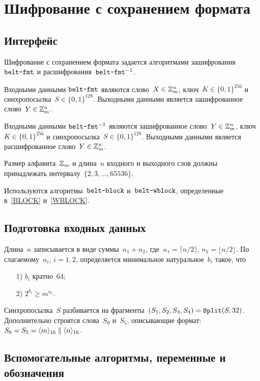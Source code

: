 \section{Шифрование с сохранением формата}\label{FMT}

\subsection{Интерфейс}\label{FMT.IFace}

Шифрование с сохранением формата задается алгоритмами зашифрования
$\texttt{belt-fmt}$ и расшифрования~$\texttt{belt-fmt}^{-1}$.

Входными данными $\texttt{belt-fmt}$ являются 
слово~$X\in\mathbb{Z}_m^n$, ключ~$K\in\{0,1\}^{256}$ 
и синхропосылка~$S\in\{0,1\}^{128}$.
%
Выходными данными является зашифрованное слово~$Y\in\mathbb{Z}_m^n$.

Входными данными $\texttt{belt-fmt}^{-1}$ являются 
зашифрованное слово~$Y\in\mathbb{Z}_m^n$, ключ~$K\in\{0,1\}^{256}$ 
и синхропосылка~$S\in\{0,1\}^{128}$.
%
Выходными данными является расшифрованное слово~$Y\in\mathbb{Z}_m^n$.

Размер алфавита~$\mathbb{Z}_m$ и длина~$n$ входного и выходного слов 
должны принадлежать интервалу~$\{2,3,\ldots,65536\}$.

Используются алгоритмы~$\texttt{belt-block}$ и~$\texttt{belt-wblock}$,
определенные в~\ref{BLOCK} и~\ref{WBLOCK}.

\subsection{Подготовка входных данных}\label{FMT.Data}

Длина~$n$ записывается в виде суммы~$n_1+n_2$,
где~$n_1=\lceil n/2\rceil$, $n_2=\lfloor n/2\rfloor$.
%
По слагаемому~$n_i$, $i=1,2$, определяется минимальное натуральное~$b_i$ 
такое, что
\begin{enumerate}
\item[1)]
$b_i$ кратно~$64$;
\item[2)]
$2^{b_i}\geq m^{n_i}$.
\end{enumerate}

Синхропосылка~$S$ разбивается на фрагменты~$(S_1,S_2,S_3,S_4)=\mathop{\texttt{Split}}\nolimits(S,32)$. 
%
Дополнительно строятся слова~$S_0$ и~$S_5$, описывающие формат: 
$S_0=S_5=\langle m\rangle_{16}\parallel\langle n\rangle_{16}$. 

\subsection{Вспомогательные алгоритмы, переменные и обозначения}\label{FMT.Aux}

